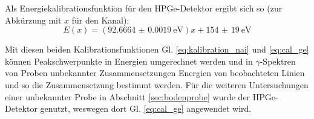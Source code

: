 Als Energiekalibrationsfunktion für den HPGe-Detektor ergibt sich so (zur Abkürzung mit $x$ für den Kanal):
\begin{equation}\label{eq:cal_ge}
    E(x)=(\SI{92.6664(19)}{\eV})x +\SI{154(19)}{\eV}
\end{equation}


Mit diesen beiden Kalibrationsfunktionen  Gl. \ref{eq:kalibration_nai} und \ref{eq:cal_ge} können Peakschwerpunkte in Energien umgerechnet werden und in $\gamma$-Spektren von Proben unbekannter Zusammensetzungen Energien von beobachteten Linien und so die Zusammensetzung bestimmt werden. Für die weiteren Untersuchungen einer unbekannter Probe in Abschnitt \ref{sec:bodenprobe} wurde der HPGe-Detektor genutzt, weswegen dort Gl. \ref{eq:cal_ge} angewendet wird.

